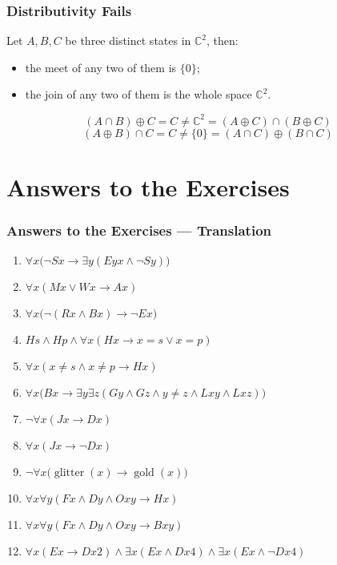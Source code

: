 \documentclass[UTF8,aspectratio=43,11pt,colorlinks,compress,openany]{beamer}%
\begin{document}
\begin{frame}\frametitle{Distributivity Fails}
Let $A,B,C$ be three distinct states in $\mathbb{C}^2$, then:
	\begin{itemize}
		\item the meet of any two of them is $\{0\}$;
		\item the join of any two of them is the whole space $\mathbb{C}^2$.
	\end{itemize}
\[(A\cap B)\oplus C=C\ne\mathbb{C}^2=(A\oplus C)\cap(B\oplus C)\]
\[(A\oplus B)\cap C=C\ne\{0\}=(A\cap C)\oplus(B\cap C)\]
\end{frame}


\section{Answers to the Exercises}


\begin{frame}\frametitle{Answers to the Exercises --- Translation}
\begin{enumerate}
	\item $\forall x\big(\neg Sx\to\exists y(Eyx\wedge \neg Sy)\big)$
	\item $\forall x(Mx\vee Wx\to Ax)$
	\item $\forall x\big(\neg (Rx\wedge Bx)\to \neg Ex\big)$
	\item $Hs\wedge Hp\wedge\forall x(Hx\to x=s\vee x=p)$
	\item $\forall x(x\ne s\wedge x\ne p\to Hx)$
	\item $\forall x\big(Bx\to \exists y\exists z(Gy\wedge Gz\wedge y\ne z\wedge Lxy\wedge Lxz)\big)$
	\item $\neg\forall x(Jx\to Dx)$
	\item $\forall x(Jx\to\neg Dx)$
	\item $\neg\forall x\big(\operatorname{glitter}(x)\to\operatorname{gold}(x)\big)$
	\item $\forall x\forall y(Fx\wedge Dy\wedge Oxy\to Hx)$
	\item $\forall x\forall y(Fx\wedge Dy\wedge Oxy\to Bxy)$
	\item $\forall x(Ex\to Dx2)\wedge \exists x (Ex\wedge Dx4)\wedge \exists x (Ex\wedge\neg Dx4)$
\end{enumerate}
\end{frame}
\end{document}
